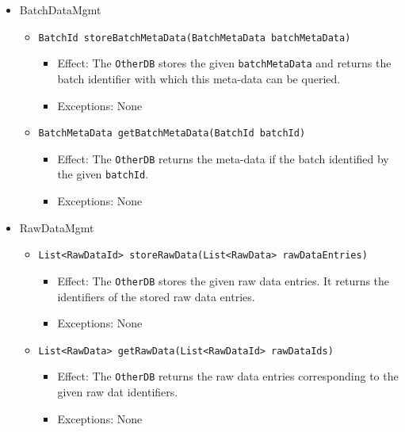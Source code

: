 \documentclass[a4paper,10pt]{article}
\begin{document}
\begin{itemize}
	\item BatchDataMgmt
    \begin{itemize}
        \item \texttt{BatchId storeBatchMetaData(BatchMetaData batchMetaData)}
        \begin{itemize}
            \item Effect: The \texttt{OtherDB} stores the given \texttt{batchMetaData} and returns the batch identifier with which this meta-data can be queried.
            \item Exceptions: None
        \end{itemize}
        
        \item \texttt{BatchMetaData getBatchMetaData(BatchId batchId)}
        \begin{itemize}
            \item Effect: The \texttt{OtherDB} returns the meta-data if the batch identified by the given \texttt{batchId}.
            \item Exceptions: None
        \end{itemize}
    \end{itemize}    
    
    	\item RawDataMgmt
    \begin{itemize}
        \item \texttt{List<RawDataId> storeRawData(List<RawData> rawDataEntries)}
        \begin{itemize}
            \item Effect: The \texttt{OtherDB} stores the given raw data entries. It returns the identifiers of the stored raw data entries.
            \item Exceptions: None
        \end{itemize}
        
        \item \texttt{List<RawData> getRawData(List<RawDataId> rawDataIds)}
        \begin{itemize}
            \item Effect: The \texttt{OtherDB} returns the raw data entries corresponding to the given raw dat identifiers.
            \item Exceptions: None
        \end{itemize}
    \end{itemize} 
    
\end{itemize}
\end{document}
